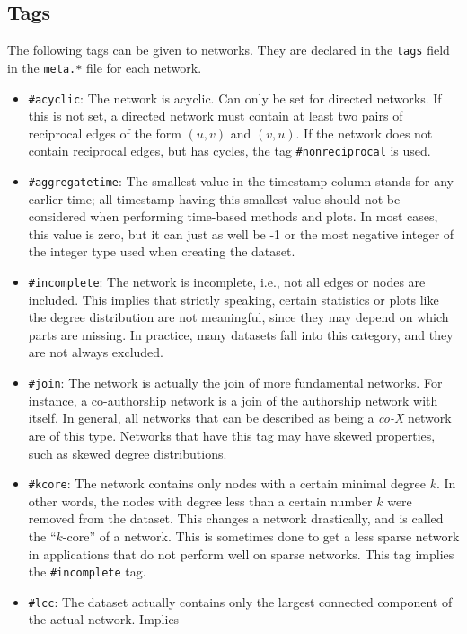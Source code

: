 \documentclass{article}
\begin{document}
\subsection{Tags}
\label{sec:tags}
The following tags can be given to networks.  They are declared in the
\texttt{tags} field in the \texttt{meta.*} file for each network. 
\begin{itemize}
\item \texttt{\#acyclic}:  The network is acyclic.  Can only be
  set for directed networks.  If this is not set, a directed
  network must contain at least two pairs of reciprocal edges of
  the form $(u,v)$ and $(v,u)$.  If the network does not contain
  reciprocal edges, but has cycles, the tag
  \texttt{\#nonreciprocal} is used.
\item \texttt{\#aggregatetime}:  The smallest value in the timestamp column
  stands for any earlier time; all timestamp having this smallest value should not be
  considered when performing time-based methods and plots.  In most
  cases, this value is zero, but it can just as well be -1 or the most
  negative integer of the integer type used when creating the dataset. 
\item \texttt{\#incomplete}: The network is incomplete, i.e.,
  not all edges or nodes are included.  This implies that
  strictly speaking, certain statistics or plots like 
  the degree distribution are not meaningful, since they may
  depend on which parts are missing.  In practice, many datasets
  fall into this category, and they are not always excluded. 
\item \texttt{\#join}:  The network is actually the join of more
  fundamental networks.  For instance, a co-authorship network
  is a join of the authorship network with itself.  In general, all
  networks that can be described as being a \emph{co-X} network are of
  this type. 
  Networks
  that have this tag may have skewed properties, such as skewed
  degree distributions.
\item \texttt{\#kcore}: The network contains only nodes with a
  certain minimal degree $k$. In other words, the nodes with
  degree less than a certain number $k$ were removed from the
  dataset.  This changes a network drastically, and is called
  the ``$k$-core'' of a network. This is sometimes done to get
  a less sparse network in applications that do not perform well
  on sparse networks. This tag implies the
  \texttt{\#incomplete} tag.
\item \texttt{\#lcc}:  The dataset actually contains only the
  largest connected component of the actual network.  Implies

\end{itemize}
\end{document}
